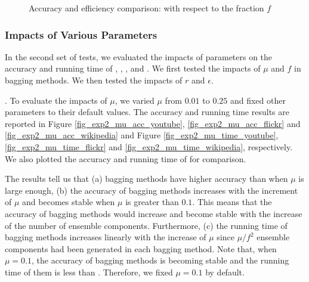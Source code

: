 {\begin{figure}[tb!]
  \quad\quad
  \vspace{-2ex}
  \caption{Accuracy and efficiency comparison: with respect to the fraction $f$}\label{fig_exp2_f}
  \vspace{-3ex}
\end{figure} 
}%






\subsubsection{Impacts of Various Parameters}
In the second set of tests, we evaluated the impacts of parameters on
the accuracy and running time of \NMF, \Node, \Edge, \Biased and \BIGCLAM. We first
tested the impacts of $\mu$ and $f$ in bagging methods. We then
tested the impacts of $r$ and $\epsilon$.



. To evaluate the impacts of $\mu$, we
varied $\mu$ from $0.01$ to $0.25$ and fixed other parameters to their
default values. The accuracy and running time results are reported in
Figure \ref{fig_exp2_mu_acc_youtube}, \ref{fig_exp2_mu_acc_flickr} and
\ref{fig_exp2_mu_acc_wikipedia} and Figure \ref{fig_exp2_mu_time_youtube},
\ref{fig_exp2_mu_time_flickr} and \ref{fig_exp2_mu_time_wikipedia},
respectively. We also plotted the accuracy and running time of \NMF for comparison.




The results tell us that (a) bagging methods have higher accuracy than
\NMF when $\mu$ is large enough, (b) the accuracy of bagging methods
increases with the increment of $\mu$ and becomes stable when $\mu$ is greater
than $0.1$. This means that the accuracy of bagging methods would increase and become stable with
the increase of the number of ensemble components. Furthermore,
(c) the running time of bagging methods increases linearly
with the increase of $\mu$ since $\mu / f^2$ ensemble components had been generated in each bagging
method. Note that, when $\mu = 0.1$, the accuracy of bagging methods
is becoming stable and the running time of them is less than
\NMF. Therefore, we fixed $\mu = 0.1$ by default.




